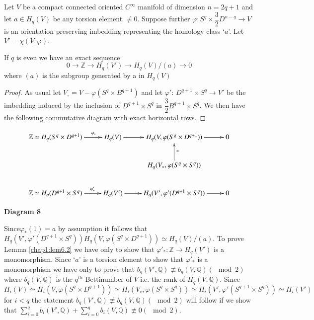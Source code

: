 Let $V$ be a compact connected oriented $C^\infty$ manifold of
dimension $n = 2q +1$ and let $a \in H_q(V)$ be any torsion
element $\neq 0$. Suppose further $\varphi: S^q \times \dfrac{3}{2}
D^{n-q} \to V$ is an orientation preserving imbedding representing the
homology class `$a$'. Let $V' = \chi (V, \varphi)$.  

\begin{lemma}\label{chap1:lem6.2}%
If $q$ is even we have an exact sequence 
$$
0 \to \mathbb{Z} \to H_q (V') \to H_q (V)/ (a) \to 0
$$
where $(a)$ is the subgroup generated by a in $H_q (V)$
\end{lemma}

\begin{proof}
As usual let $V_\circ = V - \varphi (S^q \times B^{q+1})$ and let
$\varphi'$: $D^{q+1} \times S^q \to V'$ be the imbedding induced by
the inclusion of $D^{q+1} \times S^q$ in $\dfrac{3}{2} B^{q+1} \times
S^q$. We then have the following commutative diagram with exact
horizontal rows.  
\end{proof}
{\fontsize{10}{12}\selectfont
\[
\xymatrix{
\mathbb{Z} \simeq H_q (S^q \times D^{q+1}) \ar[r]^>>>>>{\varphi_*} & H_q(V)
\ar[r] &  H_q (V, \varphi (S^q \times D^{q+1})) \ar[r] & 0 \\ 
& & H_q (V_\circ, \varphi (S^q \times S^q)) \ar[u]_\approx & \\
\mathbb{Z} \simeq H_q (D^{q+1} \times S^q) \ar[r]^>>>>>{\varphi'_*} & H_q
(V') \ar[r] & H_{q} (V', \varphi' (D^{q+1} \times S^q)) \ar[r] & 0
 }
\]}\relax
\begin{center}
{\bf Diagram 8}
\end{center}

Since\pageoriginale $\varphi_* (1) = a$ by assumption it follows that
$H_q (V', \varphi' (D^{q+1} \times S^q)) H_q (V, \varphi (S^q \times
D^{q+1})) \simeq H_q (V)/(a)$. To prove Lemma \ref{chap1:lem6.2} we have only to show
that $\varphi'_* :\mathbb{Z} \to H_q (V')$ is a monomorphism. Since
`$a$' is a torsion element to show that $\varphi'_*$ is a monomorphism
we have only to prove that $b_q (V', \mathbb{Q}) \not\equiv b_q (V,
\mathbb{Q}) (\mod 2)$ where $b_q (V, \mathbb{Q})$ is the $q^{th}$
Bettinumber of $V$ i.e. the rank of $H_q (V, \mathbb{Q})$. Since $H_i
(V) \simeq  H_i (V, \varphi (S^q \times D^{q+1})) \simeq H_i (V_\circ, \varphi
(S^q \times S^q)) \simeq H_i (V', \varphi' (S^{q+1} \times S^q)) \simeq
H_i (V')$ for $i < q$ the statement $b_q (V', \mathbb{Q}) \not\equiv
b_q (V, \mathbb{Q}) (\mod 2)$ will follow if we show that
$\sum\limits^{q}_{i = 0} b_i (V', \mathbb{Q}) +\sum\limits^{q}_{i=0}
b_i (V, \mathbb{Q}) \not\equiv 0 (\mod 2)$. 


